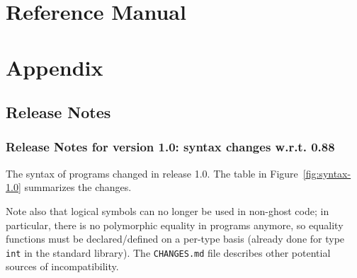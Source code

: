 \documentclass[a4paper,11pt,twoside,openright]{memoir}
\begin{document}
% 

% 





\part{Reference Manual}









% 








\part{Appendix}

\appendix

\chapter{Release Notes}

\section{Release Notes for version 1.0: syntax changes w.r.t. 0.88}

The syntax of \whyml programs changed in release 1.0.
The table in Figure~\ref{fig:syntax-1.0} summarizes the changes.

Note also that logical symbols can no longer be used in non-ghost code;
in particular, there is no polymorphic equality in programs anymore,
so equality functions must be declared/defined on a per-type basis
(already done for type \texttt{int} in the standard library). The \texttt{CHANGES.md}
file describes other potential sources of incompatibility.
\end{document}
